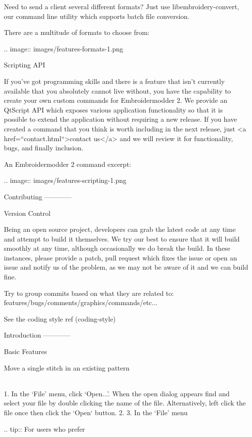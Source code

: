 \documentclass[a4paper]{report}
\begin{document}
Need to send a client several different formats? Just use libembroidery-convert, our command line utility which supports batch file conversion.

There are a multitude of formats to choose from:

.. image::
   images/features-formats-1.png

Scripting API
~~~~~~~~~~~~~

If you've got programming skills and there is a feature that isn't currently available that you absolutely cannot live without, you have the capability to create your own custom commands for Embroidermodder 2. We provide an QtScript API which exposes various application functionality so that it is possible to extend the application without requiring a new release. If you have created a command that you think is worth including in the next release, just <a href=``contact.html``>contact us</a> and we will review it for functionality, bugs, and finally inclusion.

An Embroidermodder 2 command excerpt:

.. image::
   images/features-scripting-1.png

Contributing
------------

Version Control
~~~~~~~~~~~~~~~

Being an open source project, developers can grab the latest code at any time
and attempt to build it themselves. We try our best to ensure that it will build smoothly
at any time, although occasionally we do break the build. In these instances,
please provide a patch, pull request which fixes the issue or open an issue and
notify us of the problem, as we may not be aware of it and we can build fine.

Try to group commits based on what they are related to: features/bugs/comments/graphics/commands/etc...

See the coding style ref (coding-style)

Introduction
------------

Basic Features
~~~~~~~~~~~~~~

Move a single stitch in an existing pattern
~~~~~~~~~~~~~~~~~~~~~~~~~~~~~~~~~~~~~~~~~~~

1. In the `File' menu, click `Open...'. When the open dialog appears find
  and select your file by double clicking the name of the file. Alternatively,
  left click the file once then click the `Open` button.
2.
3. In the `File' menu

.. tip::
   For users who prefer
\end{document}
